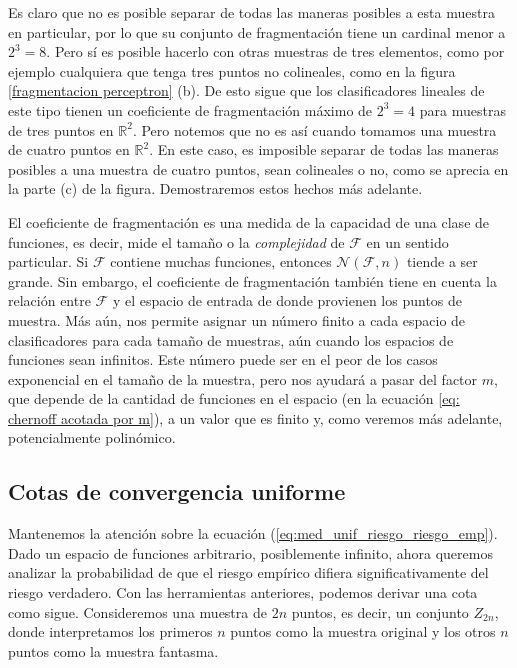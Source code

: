 \documentclass{report}
\begin{document}
Es claro que no es posible separar de todas las maneras posibles a esta muestra en particular, por lo que su conjunto de fragmentación
tiene un cardinal menor a $2^3=8$. Pero sí es posible hacerlo con otras muestras de tres elementos, como por ejemplo cualquiera que tenga 
tres puntos no colineales, como en la figura \ref{fragmentacion perceptron} (b). De esto sigue
que los clasificadores lineales de este tipo tienen un coeficiente de fragmentación máximo de $2^3=4$ para muestras de tres puntos en $\mathbb{R}^2$.
Pero notemos que no es así cuando tomamos una muestra de cuatro puntos en $\mathbb{R}^2$. En este caso, es imposible separar de todas las maneras posibles
a una muestra de cuatro puntos, sean colineales o no, como se aprecia en la parte (c) de la figura. Demostraremos estos hechos más adelante.\newline

El coeficiente de fragmentación es una medida de la capacidad de una clase de funciones, es decir, mide 
el tamaño o la \textit{complejidad} de \(\mathcal{F}\) en un sentido particular. Si \(\mathcal{F}\) contiene muchas funciones, entonces 
$\mathcal{N}(\mathcal{F}, n)$ tiende a ser grande. Sin embargo, el coeficiente de fragmentación también tiene en cuenta 
la relación entre \(\mathcal{F}\) y el espacio de entrada de donde provienen los puntos de muestra. Más aún, nos permite asignar un número
finito a cada espacio de clasificadores para cada tamaño de muestras, aún cuando los espacios de funciones sean infinitos. Este número puede
ser en el peor de los casos exponencial en el tamaño de la muestra, pero nos ayudará a pasar del factor $m$, que depende de la cantidad
de funciones en el espacio (en la ecuación \ref{eq: chernoff acotada por m}), a un valor que es finito y, como veremos más adelante,
potencialmente polinómico.\newline

\subsection{Cotas de convergencia uniforme}

Mantenemos la atención sobre la ecuación (\ref{eq:med_unif_riesgo_riesgo_emp}). Dado un espacio de funciones arbitrario, 
posiblemente infinito, ahora queremos analizar la probabilidad 
de que el riesgo empírico difiera significativamente del riesgo verdadero. Con las herramientas anteriores, 
podemos derivar una cota como sigue. Consideremos una muestra de \(2n\) puntos, es decir, un conjunto 
\(Z_{2n}\), donde interpretamos los primeros \(n\) puntos como la muestra original y los otros \(n\) 
puntos como la muestra fantasma.\newline
\end{document}
